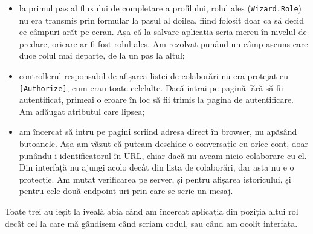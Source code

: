 \begin{itemize}
    \item la primul pas al fluxului de completare a profilului, rolul ales
    (\texttt{Wizard.Role}) nu era transmis prin formular la pasul al doilea,
    fiind folosit doar ca să decid ce câmpuri arăt pe ecran. Așa că la salvare
    aplicația scria mereu în nivelul de predare, oricare ar fi fost rolul ales.
    Am rezolvat punând un câmp ascuns care duce rolul mai departe, de la un pas
    la altul;
    \item controllerul responsabil de afișarea listei de colaborări nu era
    protejat cu \texttt{[Authorize]}, cum erau toate celelalte. Dacă intrai pe
    pagină fără să fii autentificat, primeai o eroare în loc să fii trimis la
    pagina de autentificare. Am adăugat atributul care lipsea;
    \item am încercat să intru pe pagini scriind adresa direct în browser, nu
    apăsând butoanele. Așa am văzut că puteam deschide o conversație cu orice
    cont, doar punându-i identificatorul în URL, chiar dacă nu aveam nicio
    colaborare cu el. Din interfață nu ajungi acolo decât din lista de
    colaborări, dar asta nu e o protecție. Am mutat verificarea pe server, și
    pentru afișarea istoricului, și pentru cele două endpoint-uri prin care se
    scrie un mesaj.
\end{itemize}

Toate trei au ieșit la iveală abia când am încercat aplicația din poziția altui
rol decât cel la care mă gândisem când scriam codul, sau când am ocolit
interfața.
